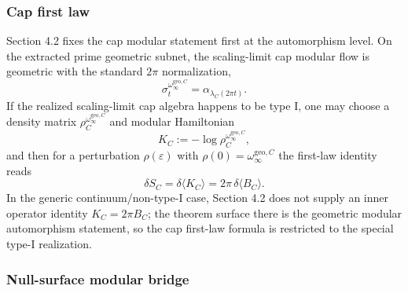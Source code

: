 \subsubsection{Cap first law}\label{51-cap-first-law}

Section 4.2 fixes the cap modular statement first at the automorphism level. On the extracted prime geometric subnet, the scaling-limit cap modular flow is geometric with the standard \(2\pi\) normalization,
\[
\sigma_t^{\omega_\infty^{\mathrm{geo},C}}
=
\alpha_{\lambda_C(2\pi t)}.
\]
If the realized scaling-limit cap algebra happens to be type I, one may choose a density matrix \(\rho_C^{\omega_\infty^{\mathrm{geo},C}}\) and modular Hamiltonian
\[
K_C:=-\log\rho_C^{\omega_\infty^{\mathrm{geo},C}},
\]
and then for a perturbation \(\rho(\varepsilon)\) with \(\rho(0)=\omega_\infty^{\mathrm{geo},C}\) the first-law identity reads
\[
\delta S_C=\delta\langle K_C\rangle
=
2\pi\,\delta\langle B_C\rangle.
\]
In the generic continuum/non-type-I case, Section 4.2 does not supply an inner operator identity \(K_C=2\pi B_C\); the theorem surface there is the geometric modular automorphism statement, so the cap first-law formula is restricted to the special type-I realization.

\subsubsection{Null-surface modular bridge}\label{52-null-surface-modular-bridge}

